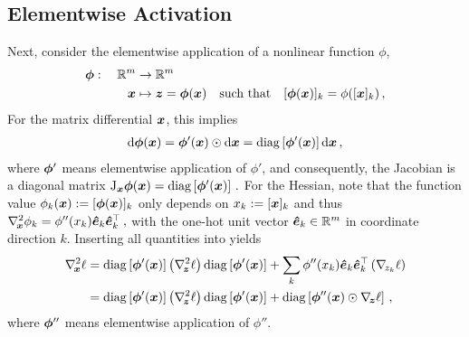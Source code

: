 \subsection{Elementwise Activation}\label{hbp::subsec:activationBackwardPass}

Next, consider the elementwise application of a nonlinear function $\phi$,
\begin{align*}
  {\bm{\phi}}:\quad\mathbb{R}^m &\to \mathbb{R}^m
  \\
  {\bm{x}} &\mapsto {\bm{z}}={\bm{\phi}}({\bm{x}}) \quad \text{such that}\quad  [{\bm{\phi}}({\bm{x}})]_k = \phi([{\bm{x}}]_k)\,,
\end{align*}
For the matrix differential \wrt ${\bm{x}}$, this implies
\begin{align*}
  \mathrm{d} {\bm{\phi}}({\bm{x}}) = {\bm{\phi}}'({\bm{x}}) \odot \mathrm{d} {\bm{x}} = \operatorname{diag}\left[{\bm{\phi}}'({\bm{x}})\right] \mathrm{d} {\bm{x}}\,,
\end{align*}
where ${\bm{\phi}}'$ means elementwise application of $\phi'$, and consequently, the
Jacobian is a diagonal matrix
\begin{math}
  \mathrm{J}_{{\bm{x}}} {\bm{\phi}}({\bm{x}}) = \operatorname{diag}\left[{\bm{\phi}}'({\bm{x}})\right]\,.
\end{math}
For the Hessian, note that the function value $\phi_{k}({\bm{x}}) := [{\bm{\phi}}({\bm{x}})]_k$
only depends on $x_k := [{\bm{x}}]_k$ and thus
\begin{math}
  \nabla_{\!{{\bm{x}}}}^{2} \phi_k = \phi''(x_k) \bm{\hat{e}}_k \bm{\hat{e}}_k^\top\,,
\end{math}
with the one-hot unit vector $\bm{\hat{e}}_k \in \mathbb{R}^m$ in coordinate direction
$k$. Inserting all quantities into 
yields
\begin{align}
  \label{hbp::equ:nonlinearHessianBackpropagation}
  \begin{split}
    \nabla_{\!{{\bm{x}}}}^{2}\ell
    &=
      \operatorname{diag}\left[{\bm{\phi}}'({\bm{x}})\right]
      \left(\nabla_{\!{{\bm{z}}}}^{2}\ell\right)
      \operatorname{diag}\left[{\bm{\phi}}'({\bm{x}})\right]
      +
      \sum_k \phi''(x_k) \bm{\hat{e}}_k \bm{\hat{e}}_k^\top \left(\nabla_{\!{z_k}}\ell\right)
    \\
    &=
      \operatorname{diag}\left[{\bm{\phi}}'({\bm{x}})\right]
      \left(\nabla_{\!{{\bm{z}}}}^{2}\ell\right)
      \operatorname{diag}\left[{\bm{\phi}}'({\bm{x}})\right]
      +
      \operatorname{diag}\left[{\bm{\phi}}''({\bm{x}}) \odot \nabla_{\!{{\bm{z}}}}\ell \right]\,,
  \end{split}
\end{align}
where ${\bm{\phi}}''$ means elementwise application of $\phi''$.

